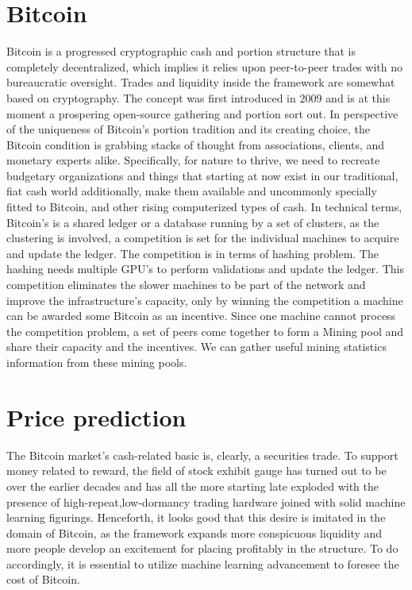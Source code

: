 \documentclass[sigconf]{acmart}
\begin{document}
\section{Bitcoin}
Bitcoin is a progressed cryptographic cash and portion structure that is completely decentralized, which implies it relies upon peer-to-peer trades with no bureaucratic oversight. Trades and liquidity inside the framework are somewhat based on cryptography. The concept was first introduced in 2009 \cite{Bitcoin} and is at this moment a prospering open-source gathering and portion sort out. In perspective of the uniqueness of Bitcoin's portion tradition and its creating choice, the Bitcoin condition is grabbing stacks of thought from associations, clients, and monetary experts alike. Specifically, for nature to thrive, we need to recreate budgetary organizations and things that starting at now exist in our traditional, fiat cash world additionally, make them available and uncommonly specially fitted to Bitcoin, and other rising computerized types of cash.
In technical terms, Bitcoin's is a shared ledger or a database running by a set of clusters, as the clustering is involved, a competition is set for the individual machines to acquire and update the ledger. The competition is in terms of hashing problem. The hashing needs multiple GPU's to perform validations and update the ledger. This competition eliminates the slower machines to be part of the network and improve the infrastructure's capacity, only by winning the competition a machine can be awarded some Bitcoin as an incentive. Since one machine cannot process the competition problem, a set of peers come together to form a Mining pool and share their capacity and the incentives. We can gather useful mining statistics information from these mining pools.
 
 \section{Price prediction}
 The Bitcoin market's cash-related basic is, clearly, a securities trade. To support money related to reward, the field of stock exhibit gauge has turned out to be over the earlier decades and has all the more starting late exploded with the presence of high-repeat,low-dormancy trading hardware joined with solid machine learning figurings. Henceforth, it looks good that this desire is imitated in the domain of Bitcoin, as the framework expands more conspicuous liquidity and more people develop an excitement for placing profitably in the structure. To do accordingly, it is essential to utilize machine learning advancement to foresee the cost of Bitcoin\cite{stock}.
 
\end{document}
